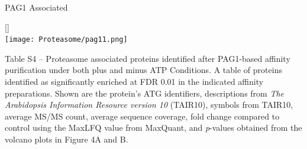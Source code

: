 \begin{FPtable}
\caption{PAG1 Associated}[]
\\
\texttt{[image: Proteasome/pag11.png]}
\label{table:pag1}
\end{FPtable}






Table S4 – Proteasome associated proteins identified after PAG1-based affinity purification under both plus and minus ATP Conditions. A table of proteins identified as significantly enriched at FDR 0.01 in the indicated affinity preparations.  Shown are the protein’s ATG identifiers, descriptions from \textit{The Arabidopsis Information Resource version 10} (TAIR10), symbols from TAIR10, average MS/MS count, average sequence coverage, fold change compared to control using the MaxLFQ value from MaxQuant, and \textit{p}-values obtained from the volcano plots in Figure 4A and B.

